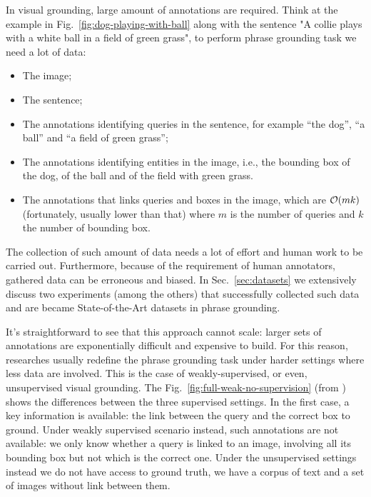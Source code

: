 In visual grounding, large amount of annotations are required. Think
at the example in Fig.~\ref{fig:dog-playing-with-ball} along with the
sentence "A collie plays with a white ball in a field of green grass",
to perform phrase grounding task we need a lot of data: 
\begin{itemize}
  \item The image;
  \item The sentence;
  \item The annotations identifying queries in the sentence, for
  example ``the dog'', ``a ball'' and ``a field of green grass'';
  \item The annotations identifying entities in the image, i.e., the
  bounding box of the dog, of the ball and of the field with green
  grass.
  \item The annotations that links queries and boxes in the image,
  which are $\mathcal{O}(mk)$ (fortunately, usually lower than that) where
  $m$ is the number of queries and $k$ the number of bounding box.
\end{itemize}
The collection of such amount of data needs a lot of effort and human
work to be carried out. Furthermore, because of the requirement of
human annotators, gathered data can be erroneous and biased. In
Sec.~\ref{sec:datasets} we extensively discuss two experiments (among
the others) that successfully collected such data and are became
State-of-the-Art datasets in phrase grounding.

It's straightforward to see that this approach cannot scale: larger
sets of annotations are exponentially difficult and expensive to
build. For this reason, researches usually redefine the phrase
grounding task under harder settings where less data are involved.
This is the case of weakly-supervised, or even, unsupervised visual
grounding. The Fig.~\ref{fig:full-weak-no-supervision} (from
\cite{wang2019phrase}) shows the differences between the three
supervised settings. In the first case, a key information is
available: the link between the query and the correct box to ground.
Under weakly supervised scenario instead, such annotations are not
available: we only know whether a query is linked to an image,
involving all its bounding box but not which is the correct one. Under
the unsupervised settings instead we do not have access to ground
truth, we have a corpus of text and a set of images without link
between them.

